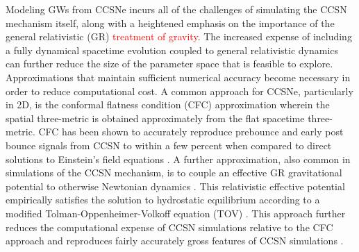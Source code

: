 \documentclass[twocolumn,times]{aastex62}  %
\begin{document}
Modeling GWs from CCSNe incurs all of the challenges of simulating the CCSN mechanism itself, along with a heightened emphasis on the importance of the general relativistic (GR) \textcolor{red}{treatment of gravity}. 
The increased expense of including a fully dynamical spacetime evolution coupled to general relativistic dynamics \citep[cf.][]{ott:2009, ott:2012} can further reduce the size of the parameter space that is feasible to explore. 
Approximations that maintain sufficient numerical accuracy become necessary in order to reduce computational cost.  
A common approach for CCSNe, particularly in 2D, is the conformal flatness condition (CFC) approximation wherein the spatial three-metric is obtained approximately from the flat spacetime three-metric.
CFC has been shown to accurately reproduce prebounce and early post bounce signals from CCSN to within a few percent when compared to direct solutions to Einstein's field equations  \citep{ott:2007}.
A further approximation, also common in simulations of the CCSN mechanism, is to couple an effective GR gravitational potential to otherwise Newtonian dynamics \citep{rampp:2002, marek:2006, bruenn:2016, oconnor:2018, morozova:2018}.  
This relativistic effective potential empirically satisfies the solution to hydrostatic equilibrium according to a modified Tolman-Oppenheimer-Volkoff equation (TOV) \citep{rampp:2002, marek:2006}.
This approach further reduces the computational expense of CCSN simulations relative to the CFC approach and reproduces fairly accurately gross features of CCSN simulations \citep{marek:2006, muller:2012}. 
\end{document}
